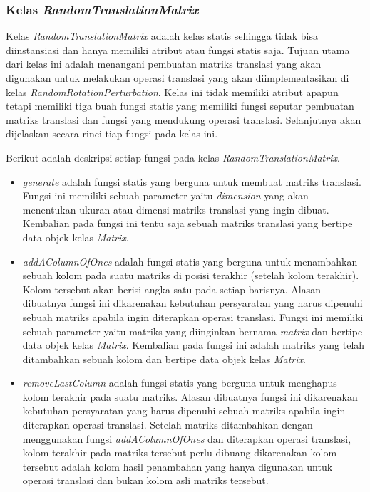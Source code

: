 \subsubsection{Kelas \textit{RandomTranslationMatrix}}
\label{subsubsec:kelas-rtm}

Kelas \textit{RandomTranslationMatrix} adalah kelas statis sehingga tidak bisa diinstansiasi dan hanya memiliki atribut atau fungsi statis saja. Tujuan utama dari kelas ini adalah menangani pembuatan matriks translasi yang akan digunakan untuk melakukan operasi translasi yang akan diimplementasikan di kelas \textit{RandomRotationPerturbation}. Kelas ini tidak memiliki atribut apapun tetapi memiliki tiga buah fungsi statis yang memiliki fungsi seputar pembuatan matriks translasi dan fungsi yang mendukung operasi translasi. Selanjutnya akan dijelaskan secara rinci tiap fungsi pada kelas ini.

Berikut adalah deskripsi setiap fungsi pada kelas \textit{RandomTranslationMatrix}.
\begin{itemize}
	\item \textit{generate} adalah fungsi statis yang berguna untuk membuat matriks translasi. Fungsi ini memiliki sebuah parameter yaitu \textit{dimension} yang akan menentukan ukuran atau dimensi matriks translasi yang ingin dibuat. Kembalian pada fungsi ini tentu saja sebuah matriks translasi yang bertipe data objek kelas \textit{Matrix}.
	\item \textit{addAColumnOfOnes} adalah fungsi statis yang berguna untuk menambahkan sebuah kolom pada suatu matriks di posisi terakhir (setelah kolom terakhir). Kolom tersebut akan berisi angka satu pada setiap barisnya. Alasan dibuatnya fungsi ini dikarenakan kebutuhan persyaratan yang harus dipenuhi sebuah matriks apabila ingin diterapkan operasi translasi. Fungsi ini memiliki sebuah parameter yaitu matriks yang diinginkan bernama \textit{matrix} dan bertipe data objek kelas \textit{Matrix}. Kembalian pada fungsi ini adalah matriks yang telah ditambahkan sebuah kolom dan bertipe data objek kelas \textit{Matrix}.
	\item \textit{removeLastColumn} adalah fungsi statis yang berguna untuk menghapus kolom terakhir pada suatu matriks. Alasan dibuatnya fungsi ini dikarenakan kebutuhan persyaratan yang harus dipenuhi sebuah matriks apabila ingin diterapkan operasi translasi. Setelah matriks ditambahkan dengan menggunakan fungsi \textit{addAColumnOfOnes} dan diterapkan operasi translasi, kolom terakhir pada matriks tersebut perlu dibuang dikarenakan kolom tersebut adalah kolom hasil penambahan yang hanya digunakan untuk operasi translasi dan bukan kolom asli matriks tersebut.
\end{itemize}

